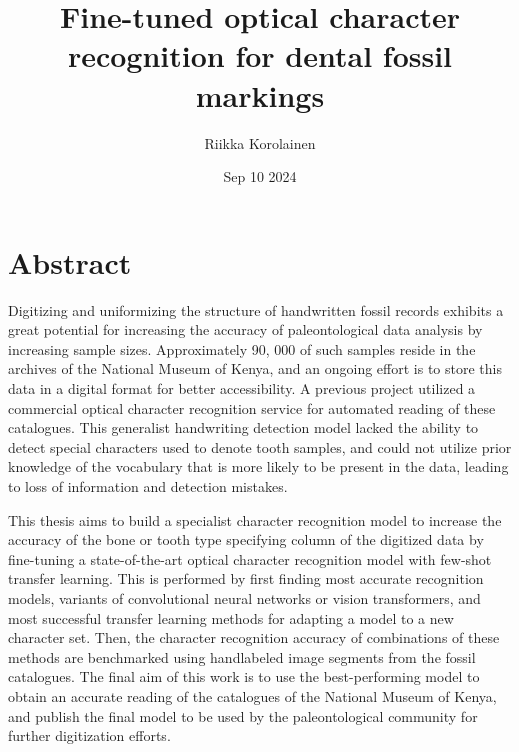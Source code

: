 \documentclass{article}
\title{Fine-tuned optical character recognition for dental fossil markings}
\author{Riikka Korolainen}
\date{Sep 10 2024}
\begin{document}
\maketitle

\section{Abstract}


Digitizing and uniformizing the structure of handwritten fossil records exhibits a great 
potential for increasing the accuracy of paleontological data analysis by increasing sample sizes. 
Approximately 90, 000 of such samples reside in the archives of the National Museum of Kenya, and 
an ongoing effort is to store this data in a digital format for better accessibility.
A previous project utilized a commercial optical character recognition service for automated reading of these catalogues. This generalist
handwriting detection model lacked the ability to detect special characters used to denote tooth samples, and could not utilize prior knowledge 
of the vocabulary that is more likely to be present in the data, leading to loss of information and detection mistakes.

This thesis aims to build a specialist character recognition model to increase the accuracy of 
the bone or tooth type specifying column of the digitized data by fine-tuning a state-of-the-art optical 
character recognition model with few-shot transfer learning. This is performed by first finding most accurate
recognition models, variants of convolutional neural networks or vision transformers, and most successful 
transfer learning methods for adapting a model to a new character set. Then, the character 
recognition accuracy of combinations of these methods are benchmarked using handlabeled image segments from the 
fossil catalogues. The final aim of this work is to use the best-performing model 
to obtain an accurate reading of the catalogues of the National Museum of Kenya, and publish the final model to be used 
by the paleontological community for further digitization efforts.
\end{document}
